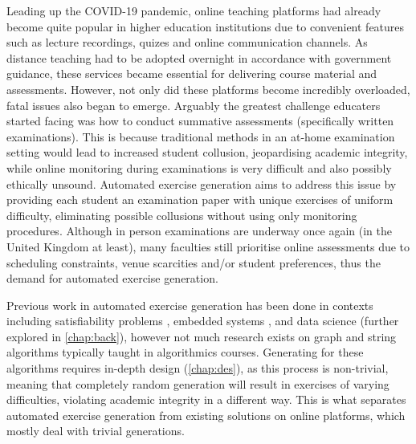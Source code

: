 \documentclass{l4proj}
\begin{document}
Leading up the COVID-19 pandemic, online teaching platforms had already become quite popular in higher education institutions due to convenient features such as lecture recordings, quizes and online communication channels. As distance teaching had to be adopted overnight in accordance with government guidance, these services became essential for delivering course material and assessments. However, not only did these platforms become incredibly overloaded, fatal issues also began to emerge. Arguably the greatest challenge educaters started facing was how to conduct summative assessments (specifically written examinations). This is because traditional methods in an at-home examination setting would lead to increased student collusion, jeopardising academic integrity, while online monitoring during examinations is very difficult and also possibly ethically unsound. Automated exercise generation aims to address this issue by providing each student an examination paper with unique exercises of uniform difficulty, eliminating possible collusions without using only monitoring procedures. Although in person examinations are underway once again (in the United Kingdom at least), many faculties still prioritise online assessments due to scheduling constraints, venue scarcities and/or student preferences, thus the demand for automated exercise generation.

Previous work in automated exercise generation has been done in contexts including satisfiability problems \cite{Hoz21}, embedded systems  \cite{Sad12}, and data science \cite{Kot19} (further explored in \autoref{chap:back}), however not much research exists on graph and string algorithms typically taught in algorithmics courses. Generating for these algorithms requires in-depth design (\autoref{chap:des}), as this process is non-trivial, meaning that completely random generation will result in exercises of varying difficulties, violating academic integrity in a different way. This is what separates automated exercise generation from existing solutions on online platforms, which mostly deal with trivial generations.
\end{document}
